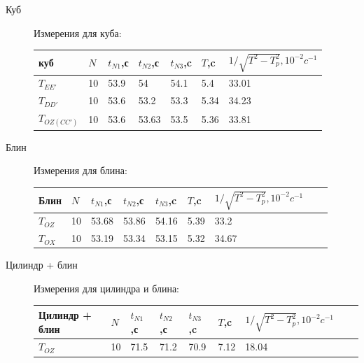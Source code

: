 \documentclass[a4paper, 10pt]{article}%
\begin{document}
\begin{itemize}
\begin{description}
    \item[Куб]Измерения для куба:
    \begin{table}[!ht]
        \centering
        \begin{tabular}{|l|l|l|l|l|l|l|}
        \hline
            куб & $N$ & $t_{N1}$,с & $t_{N2}$,с & $t_{N3}$,c & $T$,c & $1/\sqrt{T^2-T^2_{p}}, 10^{-2} c^{-1}$  \\ \hline
            $T_{EE'}$ & 10 & 53.9 & 54 & 54.1 & 5.4 & 33.01  \\ \hline
            $T_{DD'}$ & 10 & 53.6 & 53.2 & 53.3 & 5.34 & 34.23  \\ \hline
            $T_{OZ(CC')}$ & 10 & 53.6 & 53.63 & 53.5 & 5.36 & 33.81  \\ \hline
        \end{tabular}
    \end{table}
    \clearpage
    \item[Блин]Измерения для блина:
    \begin{table}[!ht]
        \centering
        \begin{tabular}{|l|l|l|l|l|l|l||l|l|}
        \hline
            Блин & $N$ & $t_{N1}$,с & $t_{N2}$,с & $t_{N3}$,c & $T$,c &
            $1/\sqrt{T^2-T^2_{p}}, 10^{-2} c^{-1}$  \\ \hline
            $T_{OZ}$ & 10 & 53.68 & 53.86 & 54.16 & 5.39 & 33.2  \\ \hline
            $T_{OX}$ & 10 & 53.19 & 53.34 & 53.15 & 5.32 & 34.67  \\ \hline
        \end{tabular}
    \end{table}
    \item[Цилиндр + блин]Измерения для цилиндра и блина:
    \begin{table}[!ht]
        \centering
        \begin{tabular}{|l|l|l|l|l|l|l||l|l|}
        \hline
            Цилиндр + блин & $N$ & $t_{N1}$,с & $t_{N2}$,с & $t_{N3}$,c & $T$,c &
            $1/\sqrt{T^2-T^2_{p}}, 10^{-2} c^{-1}$  \\ \hline
            $T_{OZ}$ & 10 & 71.5 & 71.2 & 70.9 & 7.12 & 18.04  \\ \hline
        \end{tabular}
    \end{table}
\end{description}


\end{itemize}
\end{document}
